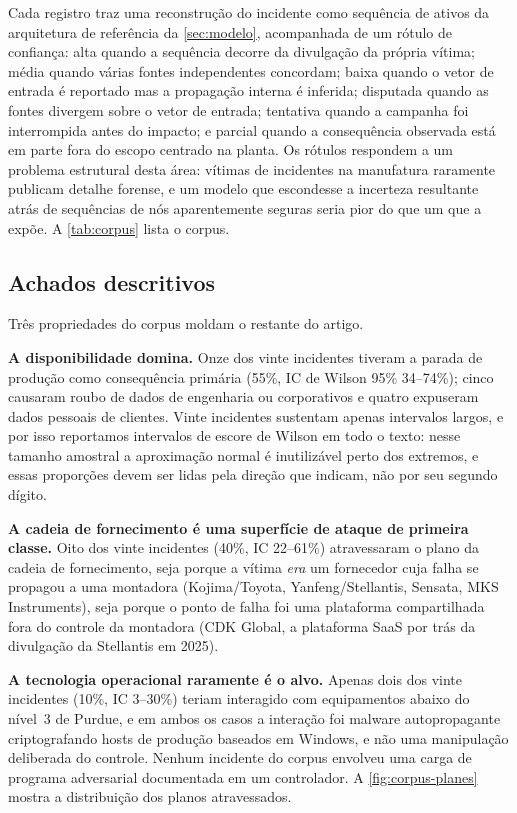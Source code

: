 Cada registro traz uma reconstrução do incidente como sequência de ativos da
arquitetura de referência da \cref{sec:modelo}, acompanhada de um rótulo de
confiança: \textsf{alta} quando a sequência decorre da divulgação da própria
vítima; \textsf{média} quando várias fontes independentes concordam;
\textsf{baixa} quando o vetor de entrada é reportado mas a propagação interna é
inferida; \textsf{disputada} quando as fontes divergem sobre o vetor de
entrada; \textsf{tentativa} quando a campanha foi interrompida antes do
impacto; e \textsf{parcial} quando a consequência observada está em parte fora
do escopo centrado na planta. Os rótulos respondem a um problema estrutural desta área: vítimas de incidentes na manufatura raramente publicam
detalhe forense, e um modelo que escondesse a incerteza resultante atrás de
sequências de nós aparentemente seguras seria pior do que um que a expõe. A
\cref{tab:corpus} lista o corpus.



\subsection{Achados descritivos}

Três propriedades do corpus moldam o restante do artigo.

\textbf{A disponibilidade domina.} Onze dos vinte incidentes tiveram a parada de
produção como consequência primária (55\%, IC de Wilson 95\% 34--74\%); cinco
causaram roubo de dados de engenharia ou corporativos e quatro expuseram dados
pessoais de clientes. Vinte incidentes sustentam apenas intervalos largos, e por
isso reportamos intervalos de escore de Wilson em todo o texto: nesse tamanho
amostral a aproximação normal é inutilizável perto dos extremos, e essas proporções devem ser lidas pela direção que indicam, não por seu
segundo dígito.

\textbf{A cadeia de fornecimento é uma superfície de ataque de primeira
classe.} Oito dos vinte incidentes (40\%, IC 22--61\%) atravessaram o plano da cadeia de fornecimento, seja porque a vítima
\emph{era} um fornecedor cuja falha se
propagou a uma montadora (Kojima/Toyota, Yanfeng/Stellantis, Sensata, MKS
Instruments), seja porque o ponto de falha foi uma plataforma compartilhada
fora do controle da montadora (CDK Global, a plataforma SaaS por trás da
divulgação da Stellantis em 2025).

\textbf{A tecnologia operacional raramente é o alvo.} Apenas dois dos vinte
incidentes (10\%, IC 3--30\%) teriam interagido com equipamentos abaixo do
nível~3 de Purdue, e em ambos os casos a interação foi malware autopropagante
criptografando hosts de produção baseados em Windows, e não uma manipulação
deliberada do controle. Nenhum incidente do corpus envolveu uma carga de
programa adversarial documentada em um controlador. A
\cref{fig:corpus-planes} mostra a distribuição dos planos atravessados.

